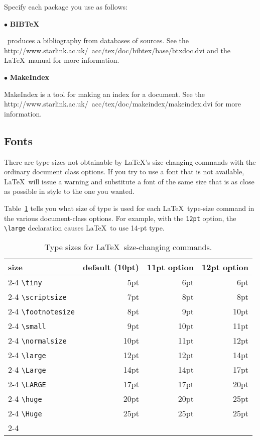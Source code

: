 \documentclass[11pt,twoside,nolof]{starlink}
\begin{document}
Specify each package you use as follows:



$\bullet$ \textbf{BIBTeX}

\BIBTeX\ produces a bibliography from databases of sources.
See the
{http://www.starlink.ac.uk/~acc/tex/doc/bibtex/base/btxdoc.dvi}\cite{bibtex}
and the \LaTeX\ manual\cite[Section 4.3.1 and Appendix B]{lamport}
for more information.


$\bullet$ \textbf{MakeIndex}

MakeIndex is a tool for making an index for a document.
See the
{http://www.starlink.ac.uk/~acc/tex/doc/makeindex/makeindex.dvi}\cite{makeindex}
for more information.

\subsection{Fonts}
\label{se:fonts}
There are type sizes not
obtainable by \LaTeX's size-changing commands with the ordinary
document class options.  If you try to use a font
that is not available, \LaTeX\ will issue a warning and substitute a font of
the same size that is as close as possible in style to the one you wanted.

Table~\ref{tab:styles} tells you what size of type is used for each
\LaTeX\ type-size command in the various document-class options.  For
example, with the \texttt{12pt} option, the \hbox{\verb|\large|}
declaration causes \LaTeX\ to use 14-pt type.

\begin{table}[htb]
\centering
\begin{tabular}{l|r|r|r|}
 &
 &
          &
        \\
\verb|\tiny|       & 5pt  & 6pt & 6pt\\
\verb|\scriptsize| & 7pt  & 8pt & 8pt\\
\verb|\footnotesize| & 8pt & 9pt & 10pt\\
\verb|\small|      & 9pt  & 10pt & 11pt\\
\verb|\normalsize| & 10pt & 11pt & 12pt \\
\verb|\large|      & 12pt & 12pt & 14pt \\
\verb|\Large|      & 14pt & 14pt & 17pt \\
\verb|\LARGE|      & 17pt & 17pt & 20pt\\
\verb|\huge|       & 20pt & 20pt & 25pt\\
\verb|\Huge|       & 25pt & 25pt & 25pt\\
\end{tabular}
\caption{Type sizes for \LaTeX\ size-changing commands.}\label{tab:styles}
\end{table}
\end{document}
